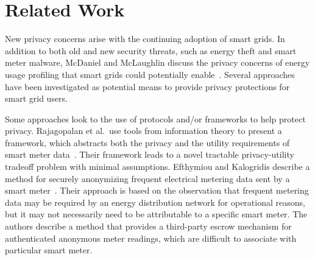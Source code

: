 \section{Related Work}
\label{sec:related}


New privacy concerns arise with the continuing adoption of smart grids. In addition to both old and new security threats, such as energy theft and smart meter malware, McDaniel and McLaughlin discuss the privacy concerns of energy usage profiling that smart grids could potentially enable~\cite{mcdaniel2009security}. Several approaches have been investigated as potential means to provide privacy protections for smart grid users.

Some approaches look to the use of protocols and/or frameworks to help protect privacy. Rajagopalan et al.\ use tools from information theory to present a framework, which abstracts both the privacy and the utility requirements of smart meter data~\cite{rajagopalan2011smart,sankar2013smart}. Their framework leads to a novel tractable privacy-utility tradeoff problem with minimal assumptions. Efthymiou and Kalogridis describe a method for securely anonymizing frequent electrical metering data sent by a smart meter~\cite{efthymiou2010smart}. Their approach is based on the observation that frequent metering data may be required by an energy distribution network for operational reasons, but it may not necessarily need to be attributable to a specific smart meter. The authors describe a method that provides a third-party escrow mechanism for authenticated anonymous meter readings, which are difficult to associate with particular smart meter.

